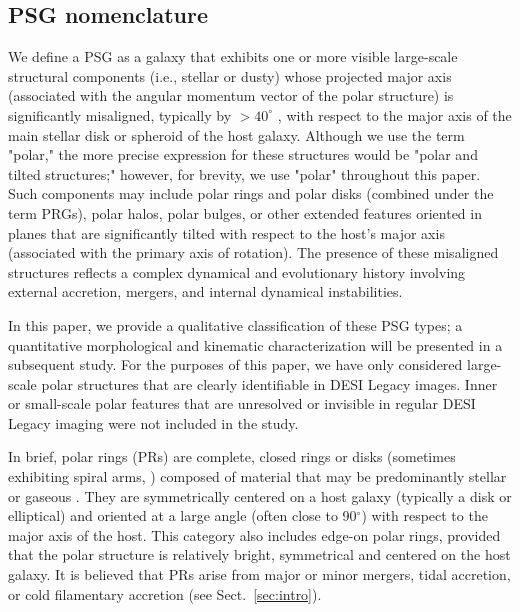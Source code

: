 \documentclass{aa}
\begin{document}
\subsection{PSG nomenclature}\label{subsec:nom}

We define a PSG as a galaxy that exhibits one or more visible large-scale structural components (i.e., stellar or dusty) whose projected major axis (associated with the angular momentum vector of the polar structure) is significantly misaligned, typically by $>40^\circ$ \citep{2013AstBu..68..371S}, with respect to the major axis of the main stellar disk or spheroid of the host galaxy. Although we use the term "polar," the more precise expression for these structures would be "polar and tilted structures;" however, for brevity, we use "polar" throughout this paper. Such components may include polar rings and polar disks (combined under the term PRGs), polar halos, polar bulges, or other extended features oriented in planes that are significantly tilted with respect to the host’s major axis (associated with the primary axis of rotation). The presence of these misaligned structures reflects a complex dynamical and evolutionary history involving external accretion, mergers, and internal dynamical instabilities.

In this paper, we provide a qualitative classification of these PSG types; a quantitative morphological and kinematic characterization will be presented in a subsequent study. For the purposes of this paper, we have only considered large-scale polar structures that are clearly identifiable in DESI Legacy images. Inner or small-scale polar features that are unresolved or invisible in regular DESI Legacy imaging were not included in the study. 

In brief, polar rings (PRs) are complete, closed rings or disks (sometimes exhibiting spiral arms, \citealt{1997PASA...14...92A,2006A&A...446..905T}) composed of material that may be predominantly stellar or gaseous \citep{1983AJ.....88..909S,1990AJ....100.1489W}. They are symmetrically centered on a host galaxy (typically a disk or elliptical) and oriented at a large angle (often close to 90$^{\circ}$) with respect to the major axis of the host. This category also includes edge-on polar rings, provided that the polar structure is relatively bright, symmetrical and centered on the host galaxy. It is believed that PRs arise from major or minor mergers, tidal accretion, or cold filamentary accretion (see Sect.~\ref{sec:intro}).
\end{document}
